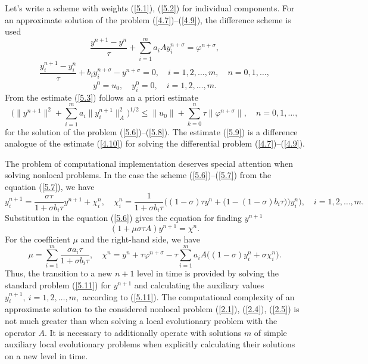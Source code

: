 \documentclass[3p]{elsarticle}
\numberwithin{equation}{section}
\begin{document}
Let's write a scheme with weights (\ref{5.1}), (\ref{5.2}) for individual components.
For an approximate solution of the problem (\ref{4.7})--(\ref{4.9}), the difference scheme is used
\begin{equation}\label{5.6}
 \frac{y^{n+1} - y^{n}}{\tau } + \sum_{i=1}^{m} a_i A y_i^{n+\sigma} = \varphi^{n+\sigma },
\end{equation} 
\begin{equation}\label{5.7}
 \frac{y_i^{n+1} - y_i^{n}}{\tau} + b_i y_i^{n+\sigma } - y^{n+\sigma} = 0 ,
 \quad i = 1,2, \ldots, m ,
 \quad n = 0,1, \ldots ,  
\end{equation} 
\begin{equation}\label{5.8}
 y^{0} = u_0,
 \quad y_i^{0} = 0,
 \quad i = 1,2, \ldots, m .  
\end{equation} 
From the estimate (\ref{5.3}) follows an a priori estimate
\begin{equation}\label{5.9}
 \Big (\|y^{n+1}\|^2 + \sum_{i=1}^{m} a_i \|y_i^{n+1}\|_{A}^2 \Big)^{1/2} \leq \|u_0\| + \sum_{k=0}^{n}\tau \|\varphi^{n+\sigma }\| ,
 \quad n = 0,1, \ldots ,
\end{equation} 
for the solution of the problem (\ref{5.6})--(\ref{5.8}).
The estimate (\ref{5.9}) is a difference analogue of the estimate (\ref{4.10}) for solving the differential problem (\ref{4.7})--(\ref{4.9}).

The problem of computational implementation deserves special attention when solving nonlocal problems.
In the case the scheme (\ref{5.6})--(\ref{5.7}) from the equation (\ref{5.7}), we have
\begin{equation}\label{5.10}
 y_i^{n+1} = \frac{\sigma \tau }{1 + \sigma b_i \tau } y^{n+1} + \chi_i^{n} ,
 \quad \chi_i^{n} =  \frac{1 }{1 + \sigma b_i \tau } \Big ( (1-\sigma) \tau y^{n} + \big (1 - (1-\sigma) b_i \tau ) \big ) y_i^{n} \Big ) ,
 \quad i = 1,2,\ldots, m .
\end{equation}  
Substitution in the equation (\ref{5.6}) gives the equation for finding $y^{n + 1}$
\begin{equation}\label{5.11}
 (1 + \mu \sigma \tau  A) y^{n+1} = \chi^{n} .
\end{equation} 
For the coefficient $\mu$ and the right-hand side, we have
\[
 \mu = \sum_{i=1}^{m} \frac{\sigma a_i \tau }{1 + \sigma b_i \tau } ,
 \quad \chi^{n} = y^{n} + \tau \varphi^{n+\sigma } - \tau \sum_{i=1}^{m} a_i A \big ( (1-\sigma) y_i^{n} + \sigma \chi_i^{n} \big ) .
\] 
Thus, the transition to a new $n+1$ level in time is provided by solving the standard problem (\ref{5.11}) for $y^{n+1}$ and calculating the auxiliary values $y_i^{n+1}, \ i = 1,2,\ldots, m,$ according to (\ref{5.11}).
The computational complexity of an approximate solution to the considered nonlocal problem (\ref{2.1}), (\ref{2.4}), (\ref{2.5}) is not much greater than when solving a local evolutionary problem with the operator $A$. 
It is necessary to additionally operate with solutions $m$ of simple auxiliary local evolutionary problems when explicitly calculating their solutions on a new level in time.
\end{document}
